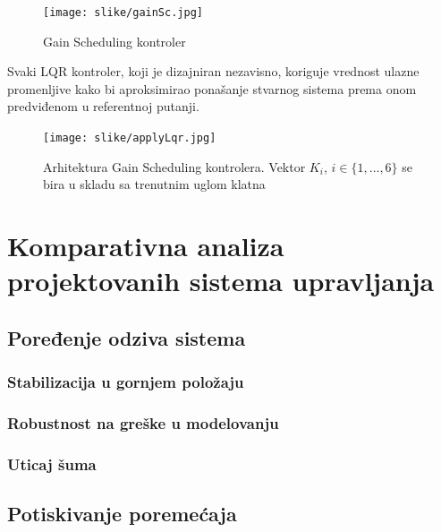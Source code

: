 \documentclass[a4paper,11pt]{article}
\theoremstyle{definition} \newtheorem{deff}{Definicija}[section]
\theoremstyle{definition} \newtheorem{prim}[deff]{Primer}
\theoremstyle{plain} \newtheorem{teor}[deff]{Teorema}
\begin{document}
	\begin{figure}[!h]
		\centering
		\texttt{[image: slike/gainSc.jpg]}
		\caption{Gain Scheduling kontroler \cite{inicijalna}}
		\label{fig:ganSc}
	\end{figure}
	
	Svaki LQR kontroler, koji je dizajniran nezavisno, koriguje vrednost ulazne promenljive kako bi aproksimirao ponašanje stvarnog sistema prema onom predviđenom u referentnoj putanji.
	
	\begin{figure}[!h]
		\centering
		\texttt{[image: slike/applyLqr.jpg]}
		\caption{Arhitektura Gain Scheduling kontrolera. Vektor $K_i$, $i \in \{1, \ldots, 6\}$ se bira u skladu sa trenutnim uglom klatna \cite{inicijalna}}
		\label{fig:archGain}
	\end{figure}
	
	
	
	
	\newpage
	
	
	\section{Komparativna analiza projektovanih sistema upravljanja}
	
	\subsection{Poređenje odziva sistema}
	\subsubsection{Stabilizacija u gornjem položaju}
	
	\subsubsection{Robustnost na greške u modelovanju}
	\subsubsection{Uticaj šuma}
	
	\subsection{Potiskivanje poremećaja}
	
	
	
\end{document}
